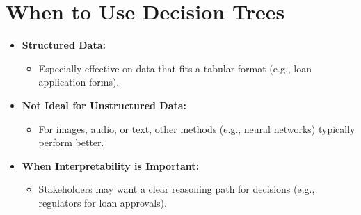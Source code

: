 \documentclass[10pt]{article}
\begin{document}
\section{When to Use Decision Trees}
\begin{itemize}
    \item \textbf{Structured Data:}
    \begin{itemize}
        \item Especially effective on data that fits a tabular format (e.g., loan application forms).
    \end{itemize}
    \item \textbf{Not Ideal for Unstructured Data:}
    \begin{itemize}
        \item For images, audio, or text, other methods (e.g., neural networks) typically perform better.
    \end{itemize}
    \item \textbf{When Interpretability is Important:}
    \begin{itemize}
        \item Stakeholders may want a clear reasoning path for decisions (e.g., regulators for loan approvals).
    \end{itemize}
\end{itemize}
\end{document}
